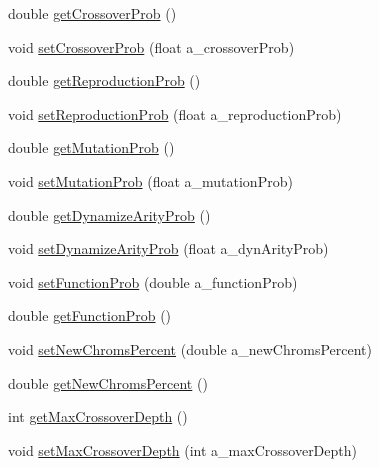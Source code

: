 \begin{DoxyCompactItemize}
\item 
double \hyperlink{classorg_1_1jgap_1_1gp_1_1impl_1_1_g_p_configuration_a919b59fd6a2dd43716d28f661ccaf924}{get\-Crossover\-Prob} ()
\item 
void \hyperlink{classorg_1_1jgap_1_1gp_1_1impl_1_1_g_p_configuration_afa4d3ba909e73d34fced58812a3e816e}{set\-Crossover\-Prob} (float a\-\_\-crossover\-Prob)
\item 
double \hyperlink{classorg_1_1jgap_1_1gp_1_1impl_1_1_g_p_configuration_ad69c3b299a47001a7c29d9acf787660e}{get\-Reproduction\-Prob} ()
\item 
void \hyperlink{classorg_1_1jgap_1_1gp_1_1impl_1_1_g_p_configuration_a87ff55054c32d242ce283fe2fd4a5e1a}{set\-Reproduction\-Prob} (float a\-\_\-reproduction\-Prob)
\item 
double \hyperlink{classorg_1_1jgap_1_1gp_1_1impl_1_1_g_p_configuration_a538e02e132777a998fd245823ad99dd8}{get\-Mutation\-Prob} ()
\item 
void \hyperlink{classorg_1_1jgap_1_1gp_1_1impl_1_1_g_p_configuration_a89b55fd9ea30a75e345a61ea637fc0dc}{set\-Mutation\-Prob} (float a\-\_\-mutation\-Prob)
\item 
double \hyperlink{classorg_1_1jgap_1_1gp_1_1impl_1_1_g_p_configuration_a6168fe89c9e8f548d8fa50013a9926f1}{get\-Dynamize\-Arity\-Prob} ()
\item 
void \hyperlink{classorg_1_1jgap_1_1gp_1_1impl_1_1_g_p_configuration_a3109cc5bfcb7f8ea1b8455efb98d2179}{set\-Dynamize\-Arity\-Prob} (float a\-\_\-dyn\-Arity\-Prob)
\item 
void \hyperlink{classorg_1_1jgap_1_1gp_1_1impl_1_1_g_p_configuration_adfc3ca52170c3682cab20bb9af22d3ce}{set\-Function\-Prob} (double a\-\_\-function\-Prob)
\item 
double \hyperlink{classorg_1_1jgap_1_1gp_1_1impl_1_1_g_p_configuration_a41090ee987a31b049689372e31629517}{get\-Function\-Prob} ()
\item 
void \hyperlink{classorg_1_1jgap_1_1gp_1_1impl_1_1_g_p_configuration_a9a310902f40497a72ee24727f44a0e8d}{set\-New\-Chroms\-Percent} (double a\-\_\-new\-Chroms\-Percent)
\item 
double \hyperlink{classorg_1_1jgap_1_1gp_1_1impl_1_1_g_p_configuration_aa23bcced6b3089ed8c903578f24f665c}{get\-New\-Chroms\-Percent} ()
\item 
int \hyperlink{classorg_1_1jgap_1_1gp_1_1impl_1_1_g_p_configuration_a4d4a0e8eb48754f47e06fcd016e265ed}{get\-Max\-Crossover\-Depth} ()
\item 
void \hyperlink{classorg_1_1jgap_1_1gp_1_1impl_1_1_g_p_configuration_a0247a458364c060930f082d2266d6a48}{set\-Max\-Crossover\-Depth} (int a\-\_\-max\-Crossover\-Depth)

\end{DoxyCompactItemize}

